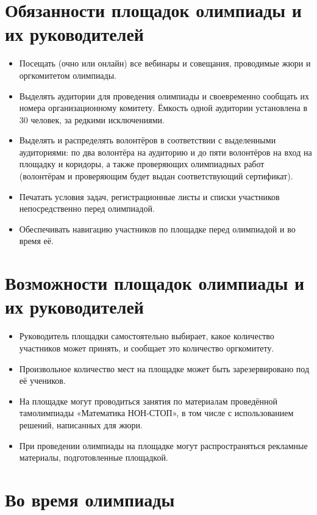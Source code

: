 \documentclass[a4paper,12pt]{article}
\newcommand{\mns}{«Математика НОН-СТОП»\xspace}
\begin{document}
\section{Обязанности площадок олимпиады и их руководителей}

\begin{itemize}
	\item Посещать (очно или онлайн) все вебинары и совещания, проводимые жюри и оргкомитетом олимпиады.
	\item Выделять аудитории для проведения олимпиады и своевременно сообщать их номера организационному комитету. Ёмкость одной аудитории установлена в 30 человек, за редкими исключениями.
	\item Выделять и распределять волонтёров в соответствии с выделенными аудиториями: по два волонтёра на аудиторию и до пяти волонтёров на вход на площадку и коридоры, а также проверяющих олимпиадных работ (волонтёрам и проверяющим будет выдан соответствующий сертификат).
	\item Печатать условия задач, регистрационные листы и списки участников непосредственно перед олимпиадой.
	\item Обеспечивать навигацию участников по площадке перед олимпиадой и во время её.
\end{itemize}

\section{Возможности площадок олимпиады и их руководителей}

\begin{itemize}
	\item Руководитель площадки самостоятельно выбирает, какое количество участников может принять, и сообщает это количество оргкомитету.
	\item Произвольное количество мест на площадке может быть зарезервировано под её учеников.
	\item На площадке могут проводиться занятия по материалам проведённой там\linebreak олимпиады \mns, в том числе с использованием решений, написанных для жюри.
	\item При проведении олимпиады на площадке могут распространяться рекламные материалы, подготовленные площадкой.
\end{itemize}

\section{Во время олимпиады}
\end{document}
